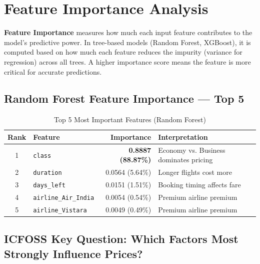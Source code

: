 \documentclass[12pt, a4paper]{article}
\begin{document}
\newpage

\section{Feature Importance Analysis}

\begin{keyterm}
\textbf{Feature Importance} measures how much each input feature contributes to the model's predictive power. In tree-based models (Random Forest, XGBoost), it is computed based on how much each feature reduces the impurity (variance for regression) across all trees. A higher importance score means the feature is more critical for accurate predictions.
\end{keyterm}

\subsection{Random Forest Feature Importance — Top 5}

\begin{table}[H]
\centering
\caption{Top 5 Most Important Features (Random Forest)}
\begin{tabular}{c l r l}
\toprule
\textbf{Rank} & \textbf{Feature} & \textbf{Importance} & \textbf{Interpretation} \\
\midrule
1 & \texttt{class}          & \textbf{0.8887 (88.87\%)} & Economy vs. Business dominates pricing \\
2 & \texttt{duration}       & 0.0564 (5.64\%)  & Longer flights cost more \\
3 & \texttt{days\_left}     & 0.0151 (1.51\%)  & Booking timing affects fare \\
4 & \texttt{airline\_Air\_India}  & 0.0054 (0.54\%)  & Premium airline premium \\
5 & \texttt{airline\_Vistara}     & 0.0049 (0.49\%)  & Premium airline premium \\
\bottomrule
\end{tabular}
\end{table}

\subsection{ICFOSS Key Question: Which Factors Most Strongly Influence Prices?}
\end{document}
